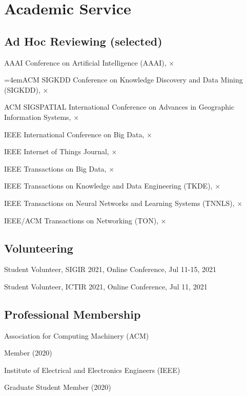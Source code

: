 \section*{Academic Service}


\subsection*{\hspace{1.8em}Ad Hoc Reviewing (selected)}
\indent

AAAI Conference on Artificial Intelligence (AAAI), $\times$

\hangindent=4emACM SIGKDD Conference on Knowledge Discovery and Data Mining (SIGKDD), $\times$

ACM SIGSPATIAL International Conference on Advances in Geographic Information Systems, $\times$

IEEE International Conference on Big Data, $\times$

IEEE Internet of Things Journal, $\times$

IEEE Transactions on Big Data, $\times$

IEEE Transactions on Knowledge and Data Engineering (TKDE), $\times$

IEEE Transactions on Neural Networks and Learning Systems (TNNLS), $\times$

IEEE/ACM Transactions on Networking (TON), $\times$


\subsection*{\hspace{1.8em}Volunteering}
\indent 

Student Volunteer, SIGIR 2021, Online Conference, Jul 11-15, 2021

Student Volunteer, ICTIR 2021, Online Conference, Jul 11, 2021

\subsection*{\hspace{1.8em}Professional Membership}
\indent 

Association for Computing Machinery (ACM)  

\hspace{2em}Member (2020)

Institute of Electrical and Electronics Engineers (IEEE)

\hspace{2em}Graduate Student Member (2020)